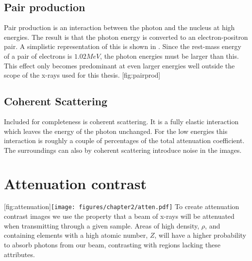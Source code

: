 \subsection{Pair production}
Pair production is an interaction between the photon and the nucleus at high energies. The result is that the photon energy is converted to an electron-positron pair. A simplistic representation of this is shown in . Since the rest-mass energy of a pair of electrons is $1.02 MeV$, the photon energies must be larger than this. This effect only becomes predominant at even larger energies well outside the scope of the x-rays used for this thesis.
[fig:pairprod]
{}

\subsection{Coherent Scattering}
Included for completeness is coherent scattering. It is a fully elastic interaction which leaves the energy of the photon unchanged. 
For the low energies this interaction is roughly a couple of percentages of the total attenuation coefficient.
The surroundings can also by coherent scattering introduce noise in the images.
\section{Attenuation contrast}
\label{sec:attenuation}
[fig:attenuation]{\texttt{[image: figures/chapter2/atten.pdf]}}
To create attenuation contrast images we use the property that a beam of x-rays will be attenuated when transmitting through a given sample. 
Areas of high density, $\rho$, and containing elements with a high atomic number, $Z$, will have a higher probability to absorb photons from our beam, contrasting with regions lacking these attributes. 

